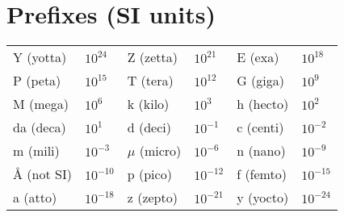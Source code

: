 \section*{Prefixes\normalfont\scriptsize{ (SI units)}}
{\footnotesize
\hspace*{19.75pt}
\begin{tabular}{@{}ll@{\ }ll@{\ }ll@{}}
\toprule
\midrule
Y (yotta)&$10^{24}$&Z (zetta)&$10^{21}$&E (exa)&$10^{18}$\\
P (peta)&$10^{15}$&T (tera)&$10^{12}$&G (giga)&$10^9$\\
M (mega)&$10^6$&k (kilo)&$10^3$&h (hecto)&$10^2$\\
da (deca)&$10^1$&d (deci)&$10^{-1}$&c (centi)&$10^{-2}$\\
m (mili)&$10^{-3}$&$\mu$ (micro)&$10^{-6}$&n (nano)&$10^{-9}$\\
Å (not SI)&$10^{-10}$&p (pico)&$10^{-12}$&f (femto)&$10^{-15}$\\
a (atto)&$10^{-18}$&z (zepto)&$10^{-21}$&y (yocto)&$10^{-24}$\\
\bottomrule
\end{tabular}    
}